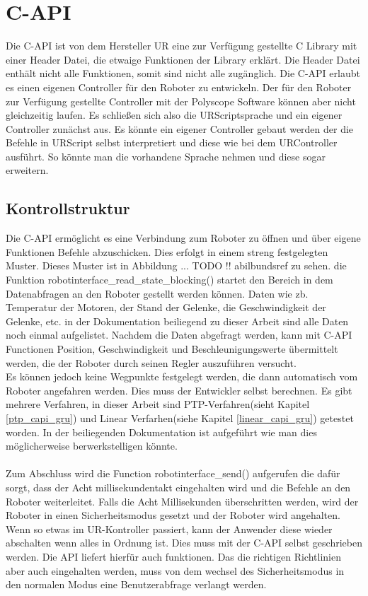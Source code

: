 \section{C-API}
\label{sec:rest_prinzip_gru}

Die C-API ist von dem Hersteller UR eine zur Verfügung gestellte C Library mit einer Header Datei, die etwaige Funktionen der Library erklärt. Die Header Datei enthält nicht alle Funktionen, somit sind nicht alle zugänglich. Die C-API erlaubt es einen eigenen Controller für den Roboter zu entwickeln. Der für den Roboter zur Verfügung gestellte Controller mit der Polyscope Software können aber nicht gleichzeitig laufen. Es schließen sich also die URScriptsprache und ein eigener Controller zunächst aus. Es könnte ein eigener Controller gebaut werden der die Befehle in URScript selbst interpretiert und diese wie bei dem URController ausführt. So könnte man die vorhandene Sprache nehmen und diese sogar erweitern.

\subsection{Kontrollstruktur}
\label{capi_control_loop_gru}	

Die C-API ermöglicht es eine Verbindung zum Roboter zu öffnen und über eigene Funktionen Befehle abzuschicken. Dies erfolgt in einem streng festgelegten Muster. Dieses Muster ist in Abbildung ... TODO !! abilbundsref zu sehen. 
die Funktion robotinterface\_read\_state\_blocking() startet den Bereich in dem Datenabfragen an den Roboter gestellt werden können. Daten wie zb. Temperatur der Motoren, der Stand der Gelenke, die Geschwindigkeit der Gelenke, etc. in der Dokumentation beiliegend zu dieser Arbeit sind alle Daten noch einmal aufgelistet. Nachdem die Daten abgefragt werden, kann mit C-API Functionen Position, Geschwindigkeit und Beschleunigungswerte übermittelt werden, die der Roboter durch seinen Regler auszuführen versucht.\\
Es können jedoch keine Wegpunkte festgelegt werden, die dann automatisch vom Roboter angefahren werden. Dies muss der Entwickler selbst 
berechnen. Es gibt mehrere Verfahren, in dieser Arbeit sind PTP-Verfahren(sieht Kapitel \ref{ptp_capi_gru}) und Linear Verfarhen(siehe Kapitel \ref{linear_capi_gru}) getestet worden. In der beiliegenden Dokumentation ist aufgeführt wie man dies möglicherweise berwerkstelligen könnte.
\\\\
Zum Abschluss wird die Function robotinterface\_send() aufgerufen die dafür sorgt, dass der Acht millisekundentakt eingehalten wird und die Befehle an den Roboter weiterleitet. Falls die Acht Millisekunden überschritten werden, wird der Roboter in einen Sicherheitsmodus gesetzt
und der Roboter wird angehalten.\\
Wenn so etwas im UR-Kontroller passiert, kann der Anwender diese wieder abschalten wenn alles in Ordnung ist. Dies muss mit der C-API selbst geschrieben werden. Die API liefert hierfür auch funktionen. Das die richtigen Richtlinien aber auch eingehalten werden, muss von dem wechsel des Sicherheitsmodus in den normalen Modus eine Benutzerabfrage verlangt werden.

